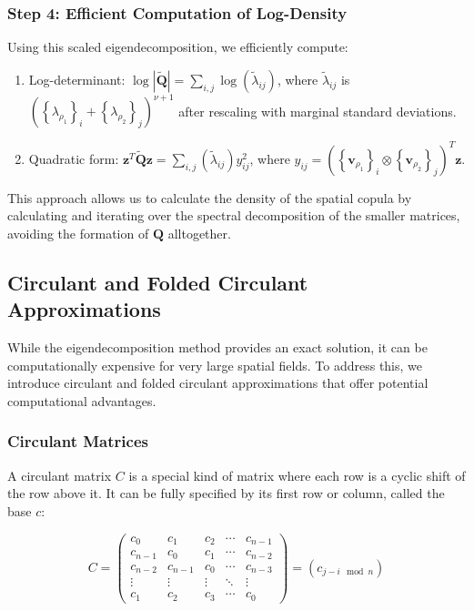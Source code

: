 \documentclass[journal=,manuscript=]{achemso}
\begin{document}
\subsubsection{Step 4: Efficient Computation of
Log-Density}\label{step-4-efficient-computation-of-log-density}

Using this scaled eigendecomposition, we efficiently compute:

\begin{enumerate}
\def\labelenumi{\arabic{enumi}.}
\item
  Log-determinant:
  \(\log|\mathbf{\widetilde Q}| = \sum_{i,j} \log(\widetilde\lambda_{ij})\),
  where \(\widetilde\lambda_{ij}\) is
  \(\left( \left\{\lambda_{\rho_1}\right\}_i + \left\{\lambda_{\rho_2}\right\}_j \right)^{\nu+1}\)
  after rescaling with marginal standard deviations.
\item
  Quadratic form:
  \(\mathbf{z}^T\mathbf{\widetilde Q}\mathbf{z} = \sum_{i,j} (\widetilde\lambda_{ij}) y_{ij}^2\),
  where
  \(y_{ij} = \left(\left\{\mathbf{v}_{\rho_1}\right\}_i \otimes \left\{\mathbf{v}_{\rho_2}\right\}_j\right)^T\mathbf{z}\).
\end{enumerate}

This approach allows us to calculate the density of the spatial copula
by calculating and iterating over the spectral decomposition of the
smaller matrices, avoiding the formation of \(\mathbf Q\) alltogether.

\subsection{Circulant and Folded Circulant
Approximations}\label{circulant-and-folded-circulant-approximations}

While the eigendecomposition method provides an exact solution, it can
be computationally expensive for very large spatial fields. To address
this, we introduce circulant and folded circulant approximations that
offer potential computational advantages.

\subsubsection{Circulant Matrices}\label{circulant-matrices}

A circulant matrix \(C\) is a special kind of matrix where each row is a
cyclic shift of the row above it. It can be fully specified by its first
row or column, called the base \(c\):

\[
C = \begin{pmatrix}
c_0 & c_1 & c_2 & \cdots & c_{n-1} \\
c_{n-1} & c_0 & c_1 & \cdots & c_{n-2} \\
c_{n-2} & c_{n-1} & c_0 & \cdots & c_{n-3} \\
\vdots & \vdots & \vdots & \ddots & \vdots \\
c_1 & c_2 & c_3 & \cdots & c_0
\end{pmatrix} = (c_{j-i \mod n})
\]
\end{document}
